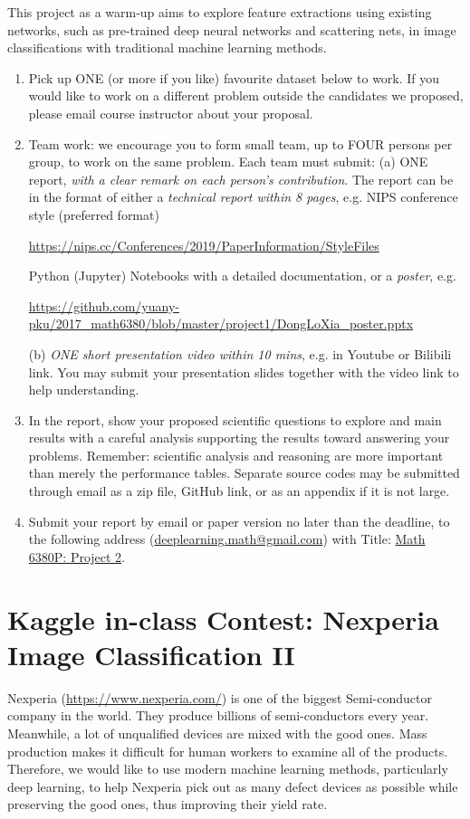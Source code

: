 \documentclass[11pt]{article}
\begin{document}
This project as a warm-up aims to explore feature extractions using existing networks, such as pre-trained deep neural networks and scattering nets, in image classifications with traditional machine learning methods.
\begin{enumerate}
\item Pick up ONE (or more if you like) favourite dataset below to work. If you would like to work on a different problem outside the candidates we proposed, please email course instructor about your proposal.  
\item Team work: we encourage you to form small team, up to FOUR persons per group, to work on the same problem. Each team must submit:
\subitem(a) ONE report, \emph{with a clear remark on each person's contribution}. The report can be in the format of either a \emph{technical report within 8 pages}, e.g. NIPS conference style (preferred format) 
\begin{center}
\url{https://nips.cc/Conferences/2019/PaperInformation/StyleFiles} 
\end{center}
Python (Jupyter) Notebooks with a detailed documentation, or a \emph{poster}, e.g. 
\begin{center}%
\url{https://github.com/yuany-pku/2017_math6380/blob/master/project1/DongLoXia_poster.pptx}
\end{center}
\subitem(b) \emph{ONE short presentation video within 10 mins}, e.g. in Youtube or Bilibili link. You may submit your presentation slides together with the video link to help understanding. 
\item In the report, show your proposed scientific questions to explore and main results with a careful analysis supporting the results toward answering your problems. Remember: scientific analysis and reasoning are more important than merely the performance tables. Separate source codes may be submitted through email as a zip file, GitHub link, or as an appendix if it is not large.    
\item Submit your report by email or paper version no later than the deadline, to the following address (\href{mailto:deeplearning.math@gmail.com}{deeplearning.math@gmail.com}) with Title: \underline{Math 6380P: Project 2}. %
\end{enumerate}

\section{Kaggle in-class Contest: Nexperia Image Classification II}
Nexperia (\url{https://www.nexperia.com/}) is one of the biggest Semi-conductor company in the world. They produce billions of semi-conductors every year. Meanwhile, a lot of unqualified devices are mixed with the good ones. Mass production makes it difficult for human workers to examine all of the products. Therefore, we would like to use modern machine learning methods, particularly deep learning, to help Nexperia pick out as many defect devices as possible while preserving the good ones, thus improving their yield rate.
\end{document}
